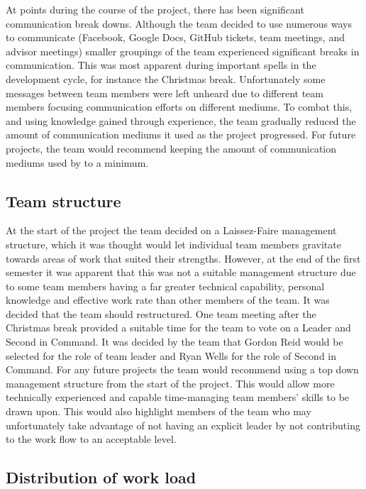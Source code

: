 At points during the course of the project, there has been significant
communication break downs. Although the team decided to use numerous ways to
communicate (Facebook, Google Docs, GitHub tickets, team meetings, and advisor
meetings) smaller groupings of the team experienced significant breaks in
communication. This was most apparent during important spells in the
development cycle, for instance the Christmas break. Unfortunately some
messages between team members were left unheard due to different team members
focusing communication efforts on different mediums. To combat this, and using
knowledge gained through experience, the team gradually reduced the amount of
communication mediums it used as the project progressed. For future projects,
the team would recommend keeping the amount of communication mediums used by  to
a minimum.

\subsection{Team structure}

At the start of the project the team decided on a Laissez-Faire management
structure, which it was thought would let individual team members gravitate
towards areas of work that suited their strengths. However, at the end of the
first semester it was apparent that this was not a suitable management
structure due to some team members having a far greater technical capability,
personal knowledge and effective work rate than other members of the team. It
was decided that the team should restructured. One team meeting after the
Christmas break provided a suitable time for the team to vote on a Leader and
Second in Command. It was decided by the team that Gordon Reid would be
selected for the role of team leader and Ryan Wells for the role of Second in
Command. For any future projects the team would recommend using a top down
management structure from the start of the project. This would allow more
technically experienced and capable time-managing team members' skills to be
drawn upon. This would also highlight members of the team who may  unfortunately
take advantage of not having an explicit leader by not  contributing to the work
flow to an acceptable level.

\subsection{Distribution of work load}

